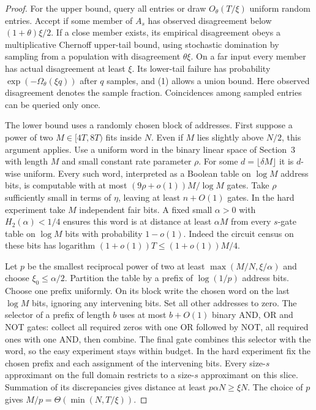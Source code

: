\begin{proof}
For the upper bound, query all entries or draw $O_\theta(T/\xi)$ uniform random entries. Accept if some member of $A_s$ has observed disagreement below $(1+\theta)\xi/2$. If a close member exists, its empirical disagreement obeys a multiplicative Chernoff upper-tail bound, using stochastic domination by sampling from a population with disagreement $\theta\xi$. On a far input every member has actual disagreement at least $\xi$. Its lower-tail failure has probability $\exp(-\Omega_\theta(\xi q))$ after $q$ samples, and (1) allows a union bound. Here observed disagreement denotes the sample fraction. Coincidences among sampled entries can be queried only once.

The lower bound uses a randomly chosen block of addresses. First suppose a power of two $M\in[4T,8T)$ fits inside $N$. Even if $M$ lies slightly above $N/2$, this argument applies. Use a uniform word in the binary linear space of Section~3 with length $M$ and small constant rate parameter $\rho$. For some $d=\lfloor\delta M\rfloor$ it is $d$-wise uniform. Every such word, interpreted as a Boolean table on $\log M$ address bits, is computable with at most $(9\rho+o(1))M/\log M$ gates. Take $\rho$ sufficiently small in terms of $\eta$, leaving at least $n+O(1)$ gates. In the hard experiment take $M$ independent fair bits. A fixed small $\alpha>0$ with $H_2(\alpha)<1/4$ ensures this word is at distance at least $\alpha M$ from every $s$-gate table on $\log M$ bits with probability $1-o(1)$. Indeed the circuit census on these bits has logarithm $(1+o(1))T\le(1+o(1))M/4$.

Let $p$ be the smallest reciprocal power of two at least $\max(M/N,\xi/\alpha)$ and choose $\xi_0\le\alpha/2$. Partition the table by a prefix of $\log(1/p)$ address bits. Choose one prefix uniformly. On its block write the chosen word on the last $\log M$ bits, ignoring any intervening bits. Set all other addresses to zero. The selector of a prefix of length $b$ uses at most $b+O(1)$ binary AND, OR and NOT gates: collect all required zeros with one OR followed by NOT, all required ones with one AND, then combine. The final gate combines this selector with the word, so the easy experiment stays within budget. In the hard experiment fix the chosen prefix and each assignment of the intervening bits. Every size-$s$ approximant on the full domain restricts to a size-$s$ approximant on this slice. Summation of its discrepancies gives distance at least $p\alpha N\ge\xi N$. The choice of $p$ gives $M/p=\Theta(\min(N,T/\xi))$.


\end{proof}
